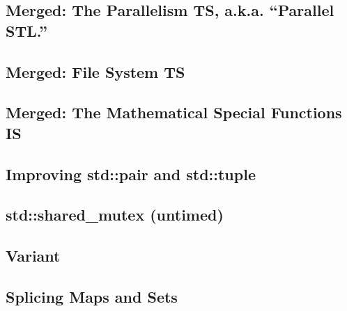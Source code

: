 \documentclass{book}
\begin{document}
\subsection{Merged: The Parallelism TS, a.k.a. “Parallel STL.”}

\subsection{Merged: File System TS}

\subsection{Merged: The Mathematical Special Functions IS}

\subsection{Improving std::pair and std::tuple}

\subsection{std::shared\_mutex (untimed)}

\subsection{Variant}

\subsection{Splicing Maps and Sets}


	
\end{document}
